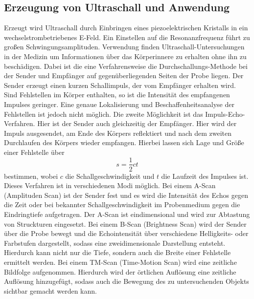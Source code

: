 \subsection{Erzeugung von Ultraschall und Anwendung}
Erzeugt wird Ultraschall durch Einbringen eines piezoelektrischen Kristalls in ein wechselstrombetriebenes E-Feld. Ein Einstellen auf die Resonanzfrequenz führt zu großen Schwingungsamplituden.\newline
Verwendung finden Ultraschall-Untersuchungen in der Medizin um Informationen über das Körperinnere zu erhalten ohne ihn zu beschädigen.\newline
Dabei ist die eine Verfahrensweise die Durchschallungs-Methode bei der Sender und Empfänger auf gegenüberliegenden Seiten der Probe liegen. Der Sender erzeugt einen kurzen Schallimpuls, der vom Empfänger erhalten wird. Sind Fehlstellen im Körper enthalten, so ist die Intensität des empfangenen Impulses geringer. Eine genaue Lokalisierung und Beschaffenheitsanalyse der Fehlstellen ist jedoch nicht möglich.\newline
Die zweite Möglichkeit ist das Impuls-Echo-Verfahren.
Hier ist der Sender auch gleichzeitig der Empfänger. Hier wird der Impuls ausgesendet, am Ende des Körpers reflektiert und nach dem zweiten Durchlaufen des Körpers wieder empfangen.
Hierbei lassen sich Lage und Größe einer Fehlstelle über 
\begin{equation}
s=\frac{1}{2}c t
\end{equation}
bestimmen, wobei $c$ die Schallgeschwindigkeit und $t$ die Laufzeit des Impulses ist.\\ Dieses Verfahren ist in verschiedenen Modi möglich.
Bei einem A-Scan (Amplituden Scan) ist der Sender fest und es wird die Intensität des Echos gegen die Zeit oder bei bekannter Schallgeschwindigkeit im Probenmedium gegen die Eindringtiefe aufgetragen. Der A-Scan ist eindimensional und wird zur Abtastung von Struckturen eingesetzt.
Bei einem B-Scan (Brightness Scan) wird der Sender über die Probe bewegt und die Echointensität über verschiedene Helligkeits- oder Farbstufen dargestellt, sodass eine zweidimensionale Darstellung entsteht. Hierdurch kann nicht nur die Tiefe, sondern auch die Breite einer Fehlstelle ermittelt werden.
Bei einem TM-Scan (Time-Motion Scan) wird eine zeitliche Bildfolge aufgenommen. Hierdurch wird der örtlichen Auflösung eine zeitliche Auflösung hinzugefügt, sodass auch die Bewegung des zu untersuchenden Objekts sichtbar gemacht werden kann.
